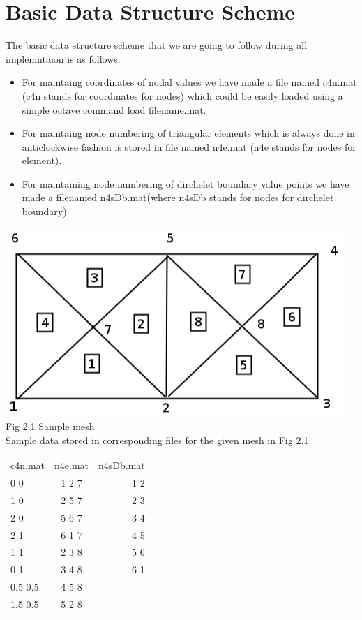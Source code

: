 \documentclass{report}
\numberwithin{equation}{chapter}
\begin{document}
\section{Basic Data Structure Scheme}
\begin{spacing}{1.5}
The basic data structure scheme that we are going to follow during all implemntaion is as follows:
\begin{itemize}
\item For maintaing coordinates of nodal values we have made a file named c4n.mat (c4n stands for coordinates for nodes) which could be easily loaded using a simple octave command load filename.mat.
\item For maintaing node numbering of triangular elements which is always done in anticlockwise fashion is stored in file named n4e.mat (n4e stands for nodes for element).\\
\item For maintaining node numbering of dirchelet boundary value points we have made a filenamed n4sDb.mat(where n4sDb stands for nodes for dirchelet boundary)
\end{itemize}
\begin{center}
\includegraphics[scale=0.5]{mesh}\\
Fig 2.1 Sample mesh\\
Sample data stored in corresponding files for the given mesh in Fig 2.1\\
\begin{tabular}{l c r}
\hline c4n.mat & n4e.mat & n4sDb.mat \\
0  0 & 1 2 7 & 1 2\\
1  0 & 2 5 7 & 2 3\\
2  0 & 5 6 7 & 3 4\\
2  1 & 6 1 7 & 4 5\\
1  1 & 2 3 8 & 5 6\\
0  1 & 3 4 8 & 6 1\\
0.5  0.5 & 4 5 8\\
1.5  0.5 & 5 2 8\\
\end{tabular}
\end{center}
\end{spacing}
\end{document}
